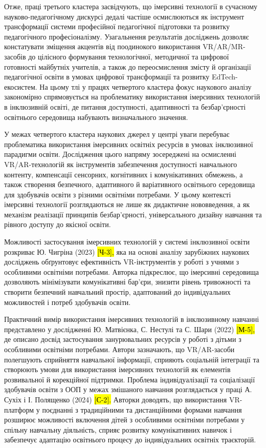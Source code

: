 Отже, праці третього кластера засвідчують, що імерсивні технології в сучасному науково-педагогічному дискурсі дедалі частіше осмислюються як інструмент трансформації системи професійної педагогічної підготовки та розвитку педагогічного професіоналізму. Узагальнення результатів досліджень дозволяє констатувати зміщення акцентів від поодинокого використання VR/AR/MR-засобів до цілісного формування технологічної, методичної та цифрової готовності майбутніх учителів, а також до переосмислення змісту й організації педагогічної освіти в умовах цифрової трансформації та розвитку EdTech-екосистем. На цьому тлі у працях четвертого кластера фокус наукового аналізу закономірно спрямовується на проблематику використання імерсивних технологій в інклюзивній освіті, де питання доступності, адаптивності та безбар'єрності освітнього середовища набувають визначального значення.

У межах четвертого кластера наукових джерел у центрі уваги перебуває проблематика використання імерсивних освітніх ресурсів в умовах інклюзивної парадигми освіти. Дослідження цього напряму зосереджені на осмисленні VR/AR-технологій як інструментів забезпечення доступності навчального контенту, компенсації сенсорних, когнітивних і комунікативних обмежень, а також створення безпечного, адаптивного й варіативного освітнього середовища для здобувачів освіти з різними освітніми потребами. У цьому контексті імерсивні технології розглядаються не лише як дидактичне нововведення, а як механізм реалізації принципів безбар'єрності, універсального дизайну навчання та рівного доступу до якісної освіти.

Можливості застосування імерсивних технологій у системі інклюзивної освіти розкриває Ю. Чигріна (2023) \hl{{[}Ч-3{]},} яка на основі аналізу зарубіжних наукових досліджень обґрунтовує ефективність VR-інструментів у роботі з учнями з особливими освітніми потребами. Авторка підкреслює, що імерсивні середовища дозволяють мінімізувати комунікативні бар'єри, знизити рівень тривожності та створити безпечний навчальний простір, адаптований до індивідуальних можливостей і потреб здобувачів освіти.

Практичний вимір використання імерсивних технологій в інклюзивному навчанні представлено у дослідженні Ю. Матвієнка, С. Нестулі та С. Шари (2022) \hl{{[}М-5{]},} де описано досвід застосування занурювальних ресурсів у роботі з дітьми з особливими освітніми потребами. Автори зазначають, що VR/AR-засоби полегшують сприйняття навчальної інформації, сприяють соціальній інтеграції та створюють умови для використання імерсивних технологій як елементів розвивальної й корекційної підтримки. Проблема індивідуалізації та соціалізації здобувачів освіти з ООП у межах змішаного навчання розглядається у праці А. Сухіх і І. Полященко (2024) \hl{{[}С-2{]}.} Авторки доводять, що використання VR-платформ у поєднанні з традиційними та дистанційними формами навчання розширює можливості включення дітей з особливими освітніми потребами у спільну навчальну діяльність, сприяє розвитку комунікативних навичок і забезпечує адаптацію освітнього процесу до індивідуальних освітніх траєкторій.

